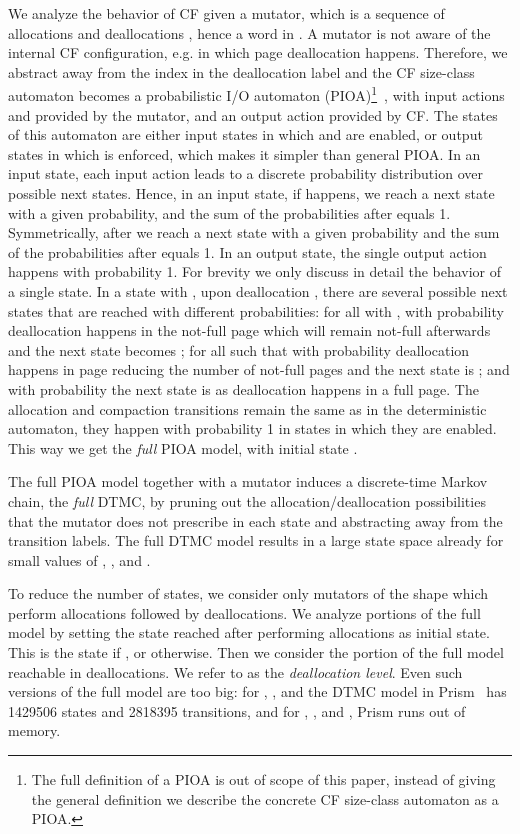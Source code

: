 \documentclass{amsart}
\begin{document}
We analyze the behavior of CF given a mutator, which is
a sequence of allocations  and deallocations , hence a word in . A mutator is
not aware of the internal CF configuration, e.g. in which page deallocation happens.
Therefore, we abstract away from the index  in the deallocation label  and the CF size-class
automaton becomes a probabilistic I/O automaton (PIOA)\footnote{{The full definition of a PIOA is out of scope of this paper, instead of giving the general definition we describe the concrete CF size-class automaton as a PIOA.}}~\cite{WSS97:tcs}, with input actions  and 
provided by the mutator, and an output action  provided by CF. The states of this automaton
are either input states
in which  and  are enabled, or output states in which  is enforced, which makes
it simpler than general PIOA. {In an input state, each input action leads to a discrete probability distribution over possible next states. Hence, in an input state, if  happens, we reach a next state with a given probability, and the sum of the probabilities after  equals 1. Symmetrically, after  we reach a next state with a given probability and the sum of the probabilities after  equals 1. In an output state, the single output action  happens with probability 1. }
For brevity we only discuss in detail the behavior of a
single state. In a state  with , upon deallocation ,
there are several possible next states that are reached with different probabilities: for all  with
, with probability  deallocation happens in the not-full page
 which will remain not-full afterwards and the next state becomes ; for all  such that  with probability 
deallocation happens in page  reducing the number of not-full pages and the
next state is ; and
with probability  the next state is 
as deallocation happens in a full page.
The allocation and compaction transitions remain the same as in the deterministic automaton, they
happen with probability 1 in states in which they are enabled.
This way we get the \emph{full} PIOA model, with initial state .

The full PIOA model together with a mutator induces a discrete-time Markov chain, the \emph{full} DTMC,
by pruning out
the allocation/deallocation possibilities that the mutator does not prescribe in each state and
abstracting away from the transition labels. The full DTMC model results in a large
state space already for small values of , , and .

To reduce the number of states, we
consider only mutators of the shape
 which perform  allocations followed by  deallocations.
We analyze portions of the full model by setting the state reached
after performing  allocations as initial state. This is the state
  if , or
 otherwise. Then we consider the portion of
the full model reachable in  deallocations. We refer to  as the \emph{deallocation level}.
Even such versions of the full model are too big:
for , , and  the DTMC model in Prism~\cite{Prism}
has 1429506 states and 2818395 transitions, and for , , and ,
Prism runs out of memory.
\end{document}

